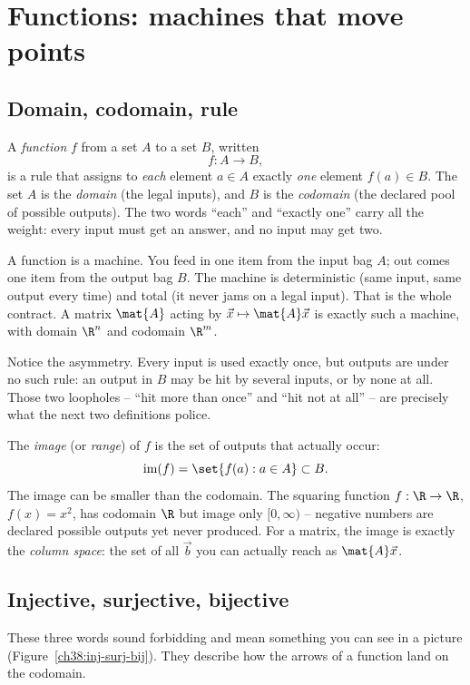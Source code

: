 \section{Functions: machines that move points}

\subsection{Domain, codomain, rule}

A \emph{function} $f$ from a set $A$ to a set $B$, written
\[
  f : A \to B,
\]
is a rule that assigns to \emph{each} element $a \in A$ exactly \emph{one} element $f(a)
\in B$. The set $A$ is the \emph{domain} (the legal inputs), and $B$ is the \emph{codomain}
(the declared pool of possible outputs). The two words ``each'' and ``exactly one'' carry
all the weight: every input must get an answer, and no input may get two.

\begin{intuitionbox}
A function is a machine. You feed in one item from the input bag $A$; out comes one item
from the output bag $B$. The machine is deterministic (same input, same output every
time) and total (it never jams on a legal input). That is the whole contract. A matrix
$\mat{A}$ acting by $\vec{x} \mapsto \mat{A}\vec{x}$ is exactly such a machine, with
domain $\R^n$ and codomain $\R^m$.
\end{intuitionbox}

Notice the asymmetry. Every input is used exactly once, but outputs are under no such
rule: an output in $B$ may be hit by several inputs, or by none at all. Those two
loopholes -- ``hit more than once'' and ``hit not at all'' -- are precisely what the next
two definitions police.

The \emph{image} (or \emph{range}) of $f$ is the set of outputs that actually occur:
\[
  \operatorname{im}(f) = \set{f(a) : a \in A} \subset B.
\]
The image can be smaller than the codomain. The squaring function $f:\R\to\R$, $f(x)=x^2$,
has codomain $\R$ but image only $[0,\infty)$ -- negative numbers are declared possible
outputs yet never produced. For a matrix, the image is exactly the \emph{column space}:
the set of all $\vec{b}$ you can actually reach as $\mat{A}\vec{x}$.

\subsection{Injective, surjective, bijective}

These three words sound forbidding and mean something you can see in a picture
(Figure~\ref{ch38:inj-surj-bij}). They
describe how the arrows of a function land on the codomain.

